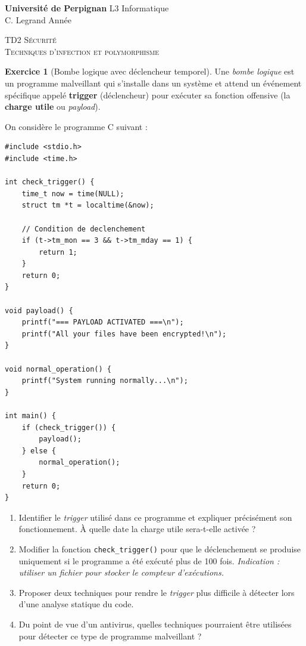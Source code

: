 \documentclass[a4paper,11pt]{article}
\theoremstyle{plain}
\theoremstyle{definition}
\newtheorem{exercice}{Exercice}
\begin{document}
\hbox{}
\noindent \textbf{Université de Perpignan} \hfill  L3 Informatique \\
 \hfill C. Legrand \hfill  Année \the\year \\
\smallskip
\begin{center}
{
  {\scshape \large TD2 Sécurité \\ Techniques d'infection et polymorphisme}  \\
}
\end{center}
\hbox{}

\bigskip

\bigskip


\begin{exercice}[Bombe logique avec déclencheur temporel]

Une \textit{bombe logique} est un programme malveillant qui s'installe dans un système et attend un événement spécifique appelé \textbf{trigger} (déclencheur) pour exécuter sa fonction offensive (la \textbf{charge utile} ou \textit{payload}).

On considère le programme C suivant :

\begin{verbatim}
#include <stdio.h>
#include <time.h>

int check_trigger() {
    time_t now = time(NULL);
    struct tm *t = localtime(&now);

    // Condition de declenchement
    if (t->tm_mon == 3 && t->tm_mday == 1) {
        return 1;
    }
    return 0;
}

void payload() {
    printf("=== PAYLOAD ACTIVATED ===\n");
    printf("All your files have been encrypted!\n");
}

void normal_operation() {
    printf("System running normally...\n");
}

int main() {
    if (check_trigger()) {
        payload();
    } else {
        normal_operation();
    }
    return 0;
}
\end{verbatim}

\begin{enumerate}
\item Identifier le \textit{trigger} utilisé dans ce programme et expliquer précisément son fonctionnement. À quelle date la charge utile sera-t-elle activée ?

\item Modifier la fonction \texttt{check\_trigger()} pour que le déclenchement se produise uniquement si le programme a été exécuté plus de 100 fois. \textit{Indication : utiliser un fichier pour stocker le compteur d'exécutions.}

\item Proposer deux techniques pour rendre le \textit{trigger} plus difficile à détecter lors d'une analyse statique du code.

\item Du point de vue d'un antivirus, quelles techniques pourraient être utilisées pour détecter ce type de programme malveillant ?
\end{enumerate}

\end{exercice}
\end{document}
